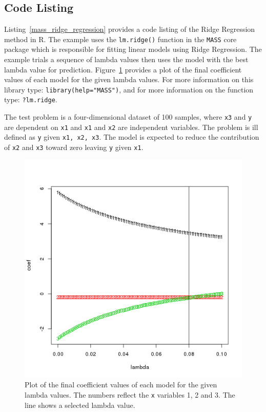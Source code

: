 \subsection{Code Listing}
Listing~\ref{mass_ridge_regression} provides a code listing of the Ridge Regression method in R.
The example uses the \texttt{lm.ridge()} function in the \texttt{MASS} core package which is responsible for fitting linear models using Ridge Regression. The example trials a sequence of lambda values then uses the model with the best lambda value for prediction. Figure~\ref{plot:ridge_regression_result} provides a plot of the final coefficient values of each model for the given lambda values. For more information on this library type: \texttt{library(help="MASS")}, and for more information on the function type: \texttt{?lm.ridge}.

The test problem is a four-dimensional dataset of 100 samples, where \texttt{x3} and \texttt{y} are dependent on \texttt{x1} and \texttt{x1} and \texttt{x2} are independent variables. The problem is ill defined as \texttt{y} given \texttt{x1, x2, x3}. The model is expected to reduce the contribution of \texttt{x2} and \texttt{x3} toward zero leaving \texttt{y} given \texttt{x1}.



\begin{figure}[htp]
\centering
\includegraphics[scale=0.70]{a_regularization/ridge_regression_result.png}
\caption{Plot of the final coefficient values of each model for the given lambda values. The numbers reflect the \texttt{x} variables 1, 2 and 3. The line shows a selected lambda value.}
\label{plot:ridge_regression_result}
\end{figure}

